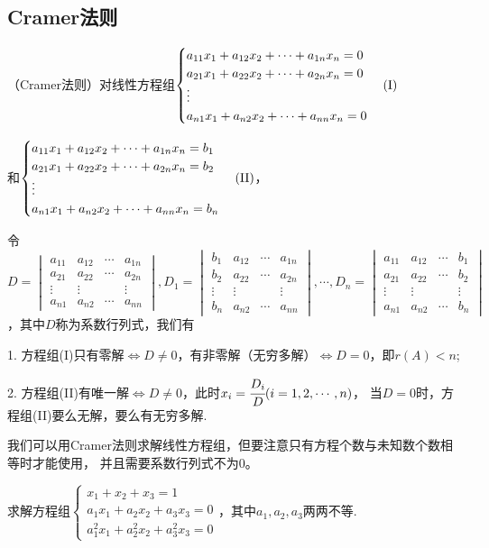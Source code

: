 \subsection{Cramer法则}
\begin{theorem}
	（\textup{Cramer}法则）对线性方程组$\begin{cases}
		a_{11}x_1+a_{12}x_2+\cdots+a_{1n}x_n=0 \\
		a_{21}x_1+a_{22}x_2+\cdots+a_{2n}x_n=0 \\
		\vdots \\
		a_{n1}x_1+a_{n2}x_2+\cdots+a_{nn}x_n=0
	\end{cases}(\textup{I})$
	
	和$\begin{cases}
		a_{11}x_1+a_{12}x_2+\cdots+a_{1n}x_n=b_1 \\
		a_{21}x_1+a_{22}x_2+\cdots+a_{2n}x_n=b_2 \\
		\vdots \\
		a_{n1}x_1+a_{n2}x_2+\cdots+a_{nn}x_n=b_n
	\end{cases}(\textup{II})$，

	令$D=\begin{vmatrix}
		a_{11} & a_{12} & \cdots & a_{1n} \\
		a_{21} & a_{22} & \cdots & a_{2n} \\
		\vdots & \vdots &  & \vdots \\
		a_{n1} & a_{n2} & \cdots & a_{nn}
	\end{vmatrix},D_1=\begin{vmatrix}
		b_1 & a_{12} & \cdots & a_{1n} \\
		b_2 & a_{22} & \cdots & a_{2n} \\
		\vdots & \vdots &  & \vdots \\
		b_n & a_{n2} & \cdots & a_{nn}
	\end{vmatrix},\cdots,D_n=\begin{vmatrix}
		a_{11} & a_{12} & \cdots & b_1 \\
		a_{21} & a_{22} & \cdots & b_2 \\
		\vdots & \vdots &  & \vdots \\
		a_{n1} & a_{n2} & \cdots & b_n
	\end{vmatrix}$，其中$D$称为系数行列式，我们有
	
	\textup{1}. 方程组\textup{(I)}只有零解$\iff D \neq 0$，有非零解（无穷多解）$\iff D=0$，即$r(A)<n$\textup{;}

	\textup{2}. 方程组\textup{(II)}有唯一解$\iff D \neq 0$，此时$x_i=\cfrac{D_i}{D}(i=1,2,\cdots,n)$，
	当$D=0$时，方程组\textup{(II)}要么无解，要么有无穷多解.
\end{theorem}
我们可以用Cramer法则求解线性方程组，但要注意只有方程个数与未知数个数相等时才能使用，
并且需要系数行列式不为0。
\begin{example}
	求解方程组$\begin{cases}
		x_1+x_2+x_3=1 \\
		a_1x_1+a_2x_2+a_3x_3=0 \\
		a_1^2x_1+a_2^2x_2+a_3^2x_3=0
	\end{cases}$，其中$a_1,a_2,a_3$两两不等.
\end{example}
